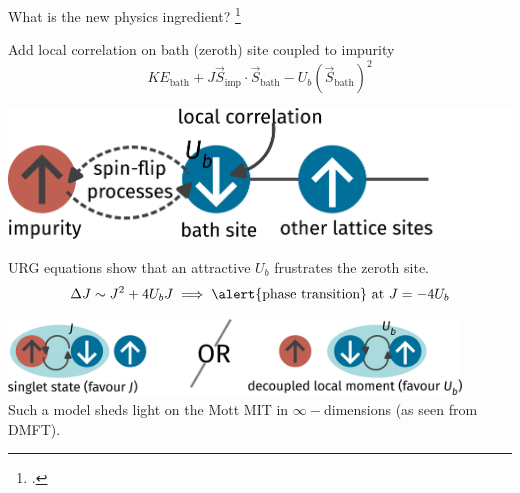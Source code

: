 \documentclass[10pt,aspectratio=169]{beamer}
\begin{document}
\begin{frame}{What is the new physics ingredient?}
\footcite{kotliar1992}
\begin{minipage}{0.39\textwidth}
	Add \alert{local correlation} on bath (zeroth) site coupled to impurity
\[KE_\text{bath} + J \vec{S}_\text{imp}\cdot\vec{S}_\text{bath} - U_b\left( \vec{S}_\text{bath} \right)^2 \]
\end{minipage}
\hspace*{\fill}
\begin{minipage}{0.55\textwidth}
\includegraphics[width=\textwidth]{zeromode_bare.pdf}
\end{minipage}

\vspace*{\fill}
URG equations show that an \alert{attractive} \(U_b\) frustrates the zeroth site.
\[\Delta J \sim J^2 + 4U_b J \implies \text{\alert{phase transition} at }J = -4U_b\]

\vspace*{\fill}
\includegraphics[width=0.9\textwidth]{frustration.pdf}\\

\vspace*{\fill}
Such a model sheds light on the Mott MIT in \(\infty-\)dimensions (as seen from DMFT).
\end{frame}
\end{document}
